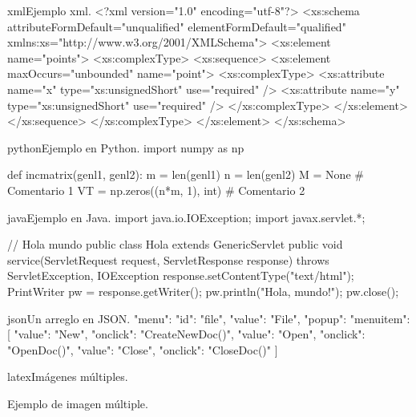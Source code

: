 \begin{sourcecode}[]{xml}{Ejemplo xml.}
<?xml version="1.0" encoding="utf-8"?>
<xs:schema attributeFormDefault="unqualified" elementFormDefault="qualified"
xmlns:xs="http://www.w3.org/2001/XMLSchema">
	<xs:element name="points">
		<xs:complexType>
			<xs:sequence>
				<xs:element maxOccurs="unbounded" name="point">
					<xs:complexType>
						<xs:attribute name="x" type="xs:unsignedShort" use="required" />
						<xs:attribute name="y" type="xs:unsignedShort" use="required" />
					</xs:complexType>
				</xs:element>
			</xs:sequence>
		</xs:complexType>
	</xs:element>
</xs:schema>
\end{sourcecode}

\begin{sourcecode}[\label{codigo-python}]{python}{Ejemplo en Python.}
import numpy as np

def incmatrix(genl1, genl2):
m = len(genl1)
n = len(genl2)
M = None # Comentario 1
VT = np.zeros((n*m, 1), int) # Comentario 2
\end{sourcecode}

\begin{sourcecode}[\label{codigo-java}]{java}{Ejemplo en Java.}
import java.io.IOException; 
import javax.servlet.*;

// Hola mundo
public class Hola extends GenericServlet {
	public void service(ServletRequest request, ServletResponse response)
	throws ServletException, IOException{
		response.setContentType("text/html");
		PrintWriter pw = response.getWriter();
		pw.println("Hola, mundo!");
		pw.close();
	}
}
\end{sourcecode}


\begin{sourcecode}{json}{Un arreglo en JSON.}
{"menu": {
	"id": "file",
	"value": "File",
	"popup": {
		"menuitem": [
		{"value": "New", "onclick": "CreateNewDoc()"},
		{"value": "Open", "onclick": "OpenDoc()"},
		{"value": "Close", "onclick": "CloseDoc()"}
		]
	}
}}
\end{sourcecode}

\begin{sourcecode}{latex}{Imágenes múltiples.}
\begin{images}[\label{imagenmultiple}]{Ejemplo de imagen múltiple.}
\end{images}
\end{sourcecode}

